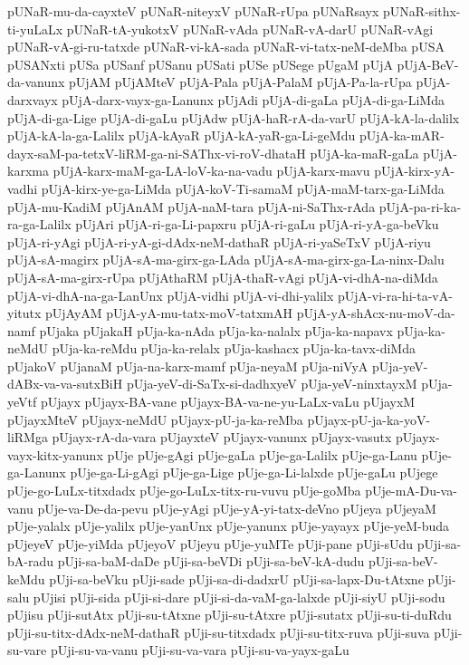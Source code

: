 {pUNaR-mu-da-cayxteV
pUNaR-niteyxV
pUNaR-rUpa
pUNaRsayx
pUNaR-sithx-ti-yuLaLx
pUNaR-tA-yukotxV
pUNaR-vAda
pUNaR-vA-darU
pUNaR-vAgi
pUNaR-vA-gi-ru-tatxde
pUNaR-vi-kA-sada
pUNaR-vi-tatx-neM-deMba
pUSA
pUSANxti
pUSa
pUSanf
pUSanu
pUSati
pUSe
pUSege
pUgaM
pUjA
pUjA-BeV-da-vanunx
pUjAM
pUjAMteV
pUjA-Pala
pUjA-PalaM
pUjA-Pa-la-rUpa
pUjA-darxvayx
pUjA-darx-vayx-ga-Lanunx
pUjAdi
pUjA-di-gaLa
pUjA-di-ga-LiMda
pUjA-di-ga-Lige
pUjA-di-gaLu
pUjAdw
pUjA-haR-rA-da-varU
pUjA-kA-la-dalilx
pUjA-kA-la-ga-Lalilx
pUjA-kAyaR
pUjA-kA-yaR-ga-Li-geMdu
pUjA-ka-mAR-dayx-saM-pa-tetxV-liRM-ga-ni-SAThx-vi-roV-dhataH
pUjA-ka-maR-gaLa
pUjA-karxma
pUjA-karx-maM-ga-LA-loV-ka-na-vadu
pUjA-karx-mavu
pUjA-kirx-yA-vadhi
pUjA-kirx-ye-ga-LiMda
pUjA-koV-Ti-samaM
pUjA-maM-tarx-ga-LiMda
pUjA-mu-KadiM
pUjAnAM
pUjA-naM-tara
pUjA-ni-SaThx-rAda
pUjA-pa-ri-ka-ra-ga-Lalilx
pUjAri
pUjA-ri-ga-Li-papxru
pUjA-ri-gaLu
pUjA-ri-yA-ga-beVku
pUjA-ri-yAgi
pUjA-ri-yA-gi-dAdx-neM-dathaR
pUjA-ri-yaSeTxV
pUjA-riyu
pUjA-sA-magirx
pUjA-sA-ma-girx-ga-LAda
pUjA-sA-ma-girx-ga-La-ninx-Dalu
pUjA-sA-ma-girx-rUpa
pUjAthaRM
pUjA-thaR-vAgi
pUjA-vi-dhA-na-diMda
pUjA-vi-dhA-na-ga-LanUnx
pUjA-vidhi
pUjA-vi-dhi-yalilx
pUjA-vi-ra-hi-ta-vA-yitutx
pUjAyAM
pUjA-yA-mu-tatx-moV-tatxmAH
pUjA-yA-shAcx-nu-moV-da-namf
pUjaka
pUjakaH
pUja-ka-nAda
pUja-ka-nalalx
pUja-ka-napavx
pUja-ka-neMdU
pUja-ka-reMdu
pUja-ka-relalx
pUja-kashacx
pUja-ka-tavx-diMda
pUjakoV
pUjanaM
pUja-na-karx-mamf
pUja-neyaM
pUja-niVyA
pUja-yeV-dABx-va-va-sutxBiH
pUja-yeV-di-SaTx-si-dadhxyeV
pUja-yeV-ninxtayxM
pUja-yeVtf
pUjayx
pUjayx-BA-vane
pUjayx-BA-va-ne-yu-LaLx-vaLu
pUjayxM
pUjayxMteV
pUjayx-neMdU
pUjayx-pU-ja-ka-reMba
pUjayx-pU-ja-ka-yoV-liRMga
pUjayx-rA-da-vara
pUjayxteV
pUjayx-vanunx
pUjayx-vasutx
pUjayx-vayx-kitx-yanunx
pUje
pUje-gAgi
pUje-gaLa
pUje-ga-Lalilx
pUje-ga-Lanu
pUje-ga-Lanunx
pUje-ga-Li-gAgi
pUje-ga-Lige
pUje-ga-Li-lalxde
pUje-gaLu
pUjege
pUje-go-LuLx-titxdadx
pUje-go-LuLx-titx-ru-vuvu
pUje-goMba
pUje-mA-Du-va-vanu
pUje-va-De-da-pevu
pUje-yAgi
pUje-yA-yi-tatx-deVno
pUjeya
pUjeyaM
pUje-yalalx
pUje-yalilx
pUje-yanUnx
pUje-yanunx
pUje-yayayx
pUje-yeM-buda
pUjeyeV
pUje-yiMda
pUjeyoV
pUjeyu
pUje-yuMTe
pUji-pane
pUji-sUdu
pUji-sa-bA-radu
pUji-sa-baM-daDe
pUji-sa-beVDi
pUji-sa-beV-kA-dudu
pUji-sa-beV-keMdu
pUji-sa-beVku
pUji-sade
pUji-sa-di-dadxrU
pUji-sa-lapx-Du-tAtxne
pUji-salu
pUjisi
pUji-sida
pUji-si-dare
pUji-si-da-vaM-ga-lalxde
pUji-siyU
pUji-sodu
pUjisu
pUji-sutAtx
pUji-su-tAtxne
pUji-su-tAtxre
pUji-sutatx
pUji-su-ti-duRdu
pUji-su-titx-dAdx-neM-dathaR
pUji-su-titxdadx
pUji-su-titx-ruva
pUji-suva
pUji-su-vare
pUji-su-va-vanu
pUji-su-va-vara
pUji-su-va-yayx-gaLu
}
